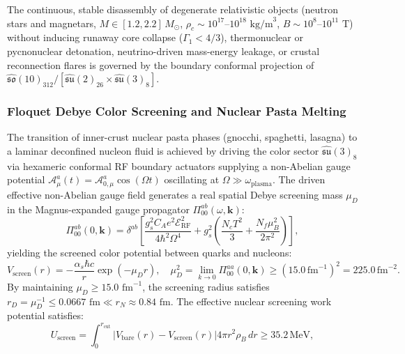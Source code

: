 \documentclass[11pt,onecolumn]{article}
\begin{document}
The continuous, stable disassembly of degenerate relativistic objects (neutron stars and magnetars, $M \in [1.2, 2.2]\,M_\odot$, $\rho_c \sim 10^{17}\text{--}10^{18}\text{ kg/m}^3$, $B \sim 10^8\text{--}10^{11}\text{ T}$) without inducing runaway core collapse ($\Gamma_1 < 4/3$), thermonuclear or pycnonuclear detonation, neutrino-driven mass-energy leakage, or crustal reconnection flares is governed by the boundary conformal projection of $\widehat{\mathfrak{so}}(10)_{312} / [\widehat{\mathfrak{su}}(2)_{26} \times \widehat{\mathfrak{su}}(3)_8]$.

\subsubsection{Floquet Debye Color Screening and Nuclear Pasta Melting}
The transition of inner-crust nuclear pasta phases (gnocchi, spaghetti, lasagna) to a laminar deconfined nucleon fluid is achieved by driving the color sector $\widehat{\mathfrak{su}}(3)_8$ via hexameric conformal RF boundary actuators supplying a non-Abelian gauge potential $\mathcal{A}_\mu^a(t) = \mathcal{A}_{0,\mu}^a \cos(\Omega t)$ oscillating at $\Omega \gg \omega_{\text{plasma}}$. The driven effective non-Abelian gauge field generates a real spatial Debye screening mass $\mu_D$ in the Magnus-expanded gauge propagator $\Pi_{00}^{ab}(\omega, \mathbf{k})$:
\begin{equation}
    \Pi_{00}^{ab}(0, \mathbf{k}) = \delta^{ab} \left[ \frac{g_s^2 C_A e^2 \mathcal{E}_{\text{RF}}^2}{4 \hbar^2 \Omega^4} + g_s^2 \left(\frac{N_c T^2}{3} + \frac{N_f \mu_B^2}{2\pi^2}\right) \right],
    \label{eq:magnus_polarization}
\end{equation}
yielding the screened color potential between quarks and nucleons:
\begin{equation}
    V_{\text{screen}}(r) = -\frac{\alpha_s \hbar c}{r} \exp(-\mu_D r), \quad \mu_D^2 = \lim_{k \to 0} \Pi_{00}^{aa}(0, \mathbf{k}) \ge (15.0\,\text{fm}^{-1})^2 = 225.0\,\text{fm}^{-2}.
    \label{eq:floquet_debye_potential}
\end{equation}
By maintaining $\mu_D \ge 15.0\text{ fm}^{-1}$, the screening radius satisfies $r_D = \mu_D^{-1} \le 0.0667\text{ fm} \ll r_N \approx 0.84\text{ fm}$. The effective nuclear screening work potential satisfies:
\begin{equation}
    U_{\text{screen}} = \int_0^{r_{\text{cut}}} \left| V_{\text{bare}}(r) - V_{\text{screen}}(r) \right| 4\pi r^2 \rho_B\,dr \ge 35.2\,\text{MeV},
    \label{eq:screening_energy_floor}
\end{equation}
\end{document}
